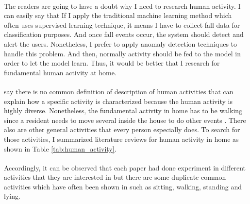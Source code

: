 \paragraph{}
The readers are going to have a doubt why I need to research human activity. I can easily say that If I apply the traditional machine learning method which often uses supervised learning technique, it means I have to collect fall data for classification purposes. And once fall events occur, the system should detect and alert the users. Nonetheless, I prefer to apply anomaly detection techniques to handle this problem. And then, normally activity should be fed to the model in order to let the model learn. Thus, it would be better that I research for fundamental human activity at home.

\paragraph{}
\citeauthor{schrader_2020} \citeyear{schrader_2020}  say there is no common definition of description of human activities that can explain how a specific activity is characterized because the human activity is highly diverse. Nonetheless, the fundamental activity in home has to be walking since a resident needs to move several inside the house to do other events \cite{oukrich_2019}. There also are other general activities that every person especially does. To search for those activities, I summarized  literature reviews for human activity in home as shown in Table \ref{tab:human_activity}.

\paragraph{}
Accordingly, it can be observed that each paper had done experiment in different activities that they are interested in but there are some duplicate common activities which have often been shown in such as sitting, walking, standing and lying.

